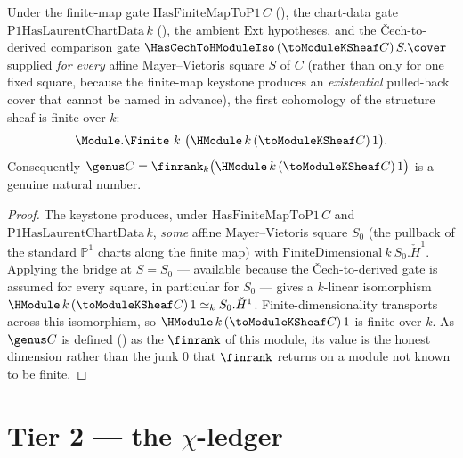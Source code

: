 \begin{theorem}
  \label{thm:adelic_module_finite_genus}
  \leanok
  Under the finite-map gate \(\mathrm{HasFiniteMapToP1}\, C\)
  (), the chart-data gate
  \(\mathrm{P1HasLaurentChartData}\, k\)
  (), the ambient \(\mathrm{Ext}\)
  hypotheses, and the Čech-to-derived comparison gate
  \(\HasCechToHModuleIso\, (\toModuleKSheaf C)\, S.\cover\) supplied
  \emph{for every} affine Mayer--Vietoris square \(S\) of \(C\) (rather
  than only for one fixed square, because the finite-map keystone
  produces an \emph{existential} pulled-back cover that cannot be named
  in advance), the first cohomology of the structure sheaf is finite
  over \(k\):
  \[
    \Module.\Finite\ k\ \bigl(\HModule\, k\, (\toModuleKSheaf C)\, 1\bigr).
  \]
  Consequently \(\genus C = \finrank_k
  \bigl(\HModule\, k\, (\toModuleKSheaf C)\, 1\bigr)\) is a genuine
  natural number.
\end{theorem}
\begin{proof}
  \leanok
  The keystone 
  produces, under \(\mathrm{HasFiniteMapToP1}\, C\) and
  \(\mathrm{P1HasLaurentChartData}\, k\), \emph{some} affine
  Mayer--Vietoris square \(S_0\) (the pullback of the standard
  \(\mathbb{P}^1\) charts along the finite map) with
  \(\mathrm{FiniteDimensional}\ k\ S_0.\check{H}^1\). Applying the
  bridge  at
  \(S = S_0\) --- available because the Čech-to-derived gate is assumed
  for every square, in particular for \(S_0\) --- gives a \(k\)-linear
  isomorphism \(\HModule\, k\, (\toModuleKSheaf C)\, 1 \simeq_k
  S_0.\check{H}^1\). Finite-dimensionality transports across this
  isomorphism, so \(\HModule\, k\, (\toModuleKSheaf C)\, 1\) is finite
  over \(k\). As \(\genus C\) is defined () as the
  \(\finrank\) of this module, its value is the honest dimension rather
  than the junk \(0\) that \(\finrank\) returns on a module not known
  to be finite.
\end{proof}

\section{Tier 2 --- the \(\chi\)-ledger}
\label{sec:RiemannRoch_Adelic_chi}

